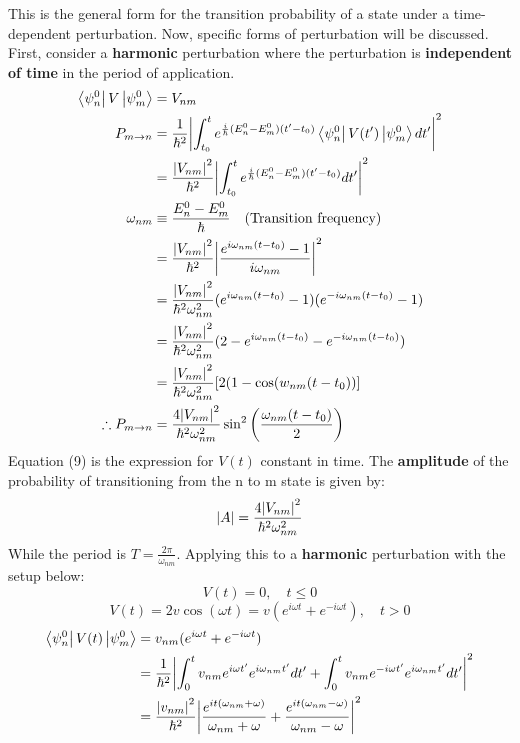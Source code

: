 \documentclass{article}
\begin{document}
\begin{flushleft}
This is the general form for the transition probability of a state under a time-dependent perturbation. Now, specific forms of perturbation will be discussed. First, consider a \textbf{harmonic} perturbation where the perturbation is \textbf{independent of time} in the period of application.
\begin{align}
    \bra{\psi_n^0}V\ket{\psi_m^0}&=V_{nm}\nonumber\\  
     P_{m\rightarrow n}&=\frac{1}{\hbar^2}\abs{\int_{t_0}^{t}e^{\frac{i}{\hbar}(E_n^0-E_m^0)(t'-t_0)}\bra{\psi_n^0}V(t')\ket{\psi_m^0}dt'}^2\nonumber\\
     &=\frac{\abs{V_{nm}}^2}{\hbar^2}\abs{\int_{t_0}^{t}e^{\frac{i}{\hbar}(E_n^0-E_m^0)(t'-t_0)}dt'}^2\nonumber\\
     \omega_{nm}&\equiv\frac{E_n^0-E_m^0}{\hbar}\quad \text{(Transition frequency)}\nonumber\\
     &=\frac{\abs{V_{nm}}^2}{\hbar^2}\abs{\frac{e^{i\omega_{nm}(t-t_0)}-1}{i\omega_{nm}}}^2\nonumber\\
     &=\frac{\abs{V_{nm}}^2}{\hbar^2\omega_{nm}^2}(e^{i\omega_{nm}(t-t_0)}-1)(e^{-i\omega_{nm}(t-t_0)}-1)\nonumber\\
     &=\frac{\abs{V_{nm}}^2}{\hbar^2\omega_{nm}^2}(2-e^{i\omega_{nm}(t-t_0)}-e^{-i\omega_{nm}(t-t_0)})\nonumber\\
     &=\frac{\abs{V_{nm}}^2}{\hbar^2\omega_{nm}^2}[2(1-\cos(w_{nm}(t-t_0))]\nonumber\\
     \therefore P_{m\rightarrow n}&=\frac{4\abs{V_{nm}}^2}{\hbar^2\omega_{nm}^2}\sin^2\bigg(\frac{\omega_{nm}(t-t_0)}{2}\bigg)
\end{align}
Equation (9) is the expression for $V(t)$ constant in time. The \textbf{amplitude} of the probability of transitioning from the n to m state is given by:
$$\abs{A}=\frac{4\abs{V_{nm}}^2}{\hbar^2\omega_{nm}^2}$$
While the period is $T=\frac{2\pi}{\omega_{nm}}$. Applying this to a \textbf{harmonic} perturbation with the setup below:
$$V(t)=0,\quad t\leq0$$
$$V(t)=2v\cos(\omega t)=v(e^{i\omega t}+e^{-i\omega t}),\quad t>0$$
\begin{align*}
    \bra{\psi_n^0}V(t)\ket{\psi_m^0}&=v_{nm}(e^{i\omega t}+e^{-i\omega t})\\
    &=\frac{1}{\hbar^2}\abs{\int_0^tv_{nm}e^{i\omega t'}e^{i\omega_{nm}t'}dt'+\int_0^tv_{nm}e^{-i\omega t'}e^{i\omega_{nm}t'}dt'}^2\\
    &=\frac{\abs{v_{nm}}^2}{\hbar^2}\abs{\frac{e^{it(\omega_{nm}+\omega)}}{\omega_{nm}+\omega}+\frac{e^{it(\omega_{nm}-\omega)}}{\omega_{nm}-\omega}}^2

\end{align*}
\end{flushleft}
\end{document}
